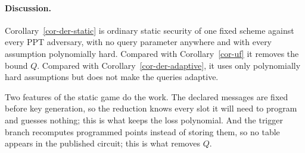 \paragraph*{Discussion.} Corollary~\ref{cor-der-static} is ordinary static security of one fixed scheme against every PPT adversary, with no query parameter anywhere and with every assumption polynomially hard. Compared with Corollary~\ref{cor-uf} it removes the bound $Q$. Compared with Corollary~\ref{cor-der-adaptive}, it uses only polynomially hard assumptions but does not make the queries adaptive.

Two features of the static game do the work. The declared messages are fixed before key generation, so the reduction knows every slot it will need to program and guesses nothing; this is what keeps the loss polynomial. And the trigger branch recomputes programmed points instead of storing them, so no table appears in the published circuit; this is what removes $Q$.

